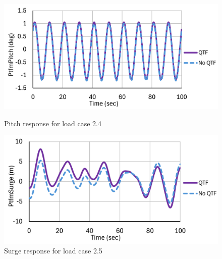 \documentclass[a4paper, 11pt]{article}
\begin{document}
\begin{figure}[H]
    \begin{minipage}{0.49\textwidth}
        \centering
        \includegraphics[width=1\textwidth]{2.4_pitch.png}
        \caption{\small Pitch response for load case 2.4} 
        \label{fig:2.4_pitch}
    \end{minipage}
    \hfill
    \begin{minipage}{0.49\textwidth}
        \centering
        \vspace{-0.3cm}
        \includegraphics[width=1\textwidth]{2.5_surge.png}
        \caption{\small Surge response for load case 2.5}
        \label{fig:2.5_surge}
    \end{minipage}
\end{figure}
\end{document}
